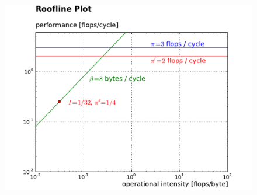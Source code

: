 \documentclass[11pt]{article}
\begin{document}
\begin{itemize}
\begin{figure}[H]
			\includegraphics[width = 6 in]{roofline.pdf}
		\end{figure}
	\end{itemize}
\end{document}
